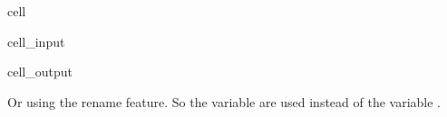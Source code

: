 \documentclass[letterpaper,10pt,english]{jupyterBook}
\begin{document}
\begin{sphinxuseclass}{cell}\begin{sphinxVerbatimInput}

\begin{sphinxuseclass}{cell_input}
\begin{sphinxVerbatim}[commandchars=\\\{\}]
\PYG{p}{[}\PYG{p}{]}
\end{sphinxVerbatim}

\end{sphinxuseclass}\end{sphinxVerbatimInput}
\begin{sphinxVerbatimOutput}

\begin{sphinxuseclass}{cell_output}
\noindent{}

\end{sphinxuseclass}\end{sphinxVerbatimOutput}

\end{sphinxuseclass}
\sphinxAtStartPar
Or using the rename feature. So the variable  are used instead of the variable .
\end{document}
